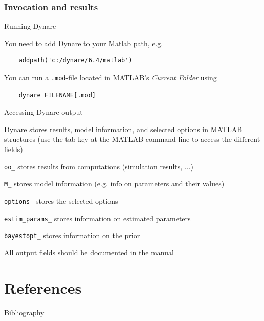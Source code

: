 \documentclass[handout,usepdftitle=false,xcolor=dvipsnames,aspectratio=169]{beamer}
\begin{document}
\section{Invocation and results}

\begin{frame}[fragile]{Running Dynare}
\begin{witemize}
    \item You need to add Dynare to your Matlab path, e.g.
    \begin{verbatim}
    addpath('c:/dynare/6.4/matlab')
    \end{verbatim}
    \item You can run a \texttt{.mod}-file located in MATLAB's \textit{Current Folder} using
    \begin{verbatim}
    dynare FILENAME[.mod]
    \end{verbatim}
\end{witemize}
\end{frame}


\begin{frame}[fragile]{Accessing Dynare output}
\begin{witemize}
    \item Dynare stores results, model information, and selected options in MATLAB structures (use the tab key at the MATLAB command line to access the different fields)
    \begin{witemize}
        \item \texttt{oo\_} stores results from computations (simulation results, ...)
        \item \texttt{M\_} stores model information (e.g. info on parameters and their values)
        \item \texttt{options\_} stores the selected options
        \item \texttt{estim\_params\_} stores information on estimated parameters
        \item \texttt{bayestopt\_} stores information on the prior
    \end{witemize}
    \item All output fields should be documented in the manual
\end{witemize}
\end{frame}



\part{References}
\begin{frame}[allowframebreaks]{Bibliography}
\printbibliography
\end{frame}
\end{document}
